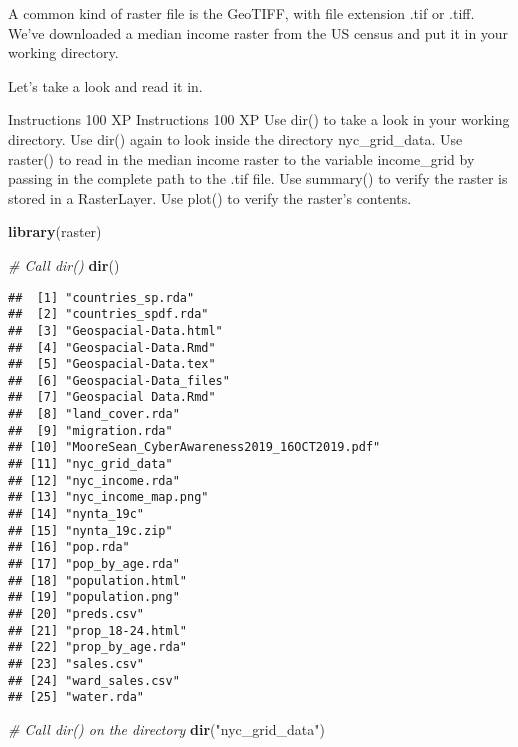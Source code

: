 \documentclass[]{article}
\newenvironment{Shaded}{\begin{snugshade}}{\end{snugshade}}
\newcommand{\CommentTok}[1]{\textcolor[rgb]{0.56,0.35,0.01}{\textit{#1}}}
\newcommand{\KeywordTok}[1]{\textcolor[rgb]{0.13,0.29,0.53}{\textbf{#1}}}
\newcommand{\NormalTok}[1]{#1}
\newcommand{\StringTok}[1]{\textcolor[rgb]{0.31,0.60,0.02}{#1}}
\begin{document}
A common kind of raster file is the GeoTIFF, with file extension .tif or
.tiff. We've downloaded a median income raster from the US census and
put it in your working directory.

Let's take a look and read it in.

Instructions 100 XP Instructions 100 XP Use dir() to take a look in your
working directory. Use dir() again to look inside the directory
nyc\_grid\_data. Use raster() to read in the median income raster to the
variable income\_grid by passing in the complete path to the .tif file.
Use summary() to verify the raster is stored in a RasterLayer. Use
plot() to verify the raster's contents.

\begin{Shaded}
\begin{Highlighting}[]
\KeywordTok{library}\NormalTok{(raster) }

\CommentTok{# Call dir()}
\KeywordTok{dir}\NormalTok{()}
\end{Highlighting}
\end{Shaded}

\begin{verbatim}
##  [1] "countries_sp.rda"                          
##  [2] "countries_spdf.rda"                        
##  [3] "Geospacial-Data.html"                      
##  [4] "Geospacial-Data.Rmd"                       
##  [5] "Geospacial-Data.tex"                       
##  [6] "Geospacial-Data_files"                     
##  [7] "Geospacial Data.Rmd"                       
##  [8] "land_cover.rda"                            
##  [9] "migration.rda"                             
## [10] "MooreSean_CyberAwareness2019_16OCT2019.pdf"
## [11] "nyc_grid_data"                             
## [12] "nyc_income.rda"                            
## [13] "nyc_income_map.png"                        
## [14] "nynta_19c"                                 
## [15] "nynta_19c.zip"                             
## [16] "pop.rda"                                   
## [17] "pop_by_age.rda"                            
## [18] "population.html"                           
## [19] "population.png"                            
## [20] "preds.csv"                                 
## [21] "prop_18-24.html"                           
## [22] "prop_by_age.rda"                           
## [23] "sales.csv"                                 
## [24] "ward_sales.csv"                            
## [25] "water.rda"
\end{verbatim}

\begin{Shaded}
\begin{Highlighting}[]
\CommentTok{# Call dir() on the directory}
\KeywordTok{dir}\NormalTok{(}\StringTok{"nyc_grid_data"}\NormalTok{)}
\end{Highlighting}
\end{Shaded}
\end{document}
